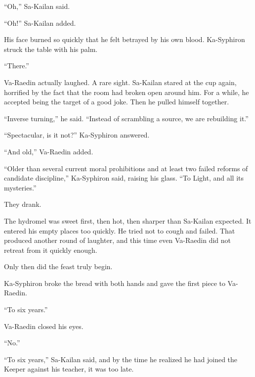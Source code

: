 “Oh,” Sa-Kailan said.\par
“Oh!” Sa-Kailan added.\par

His face burned so quickly that he felt betrayed by his own blood.
Ka-Syphiron struck the table with his palm.\par

“There.”\par

Va-Raedin actually laughed.
A rare sight.
Sa-Kailan stared at the cup again, horrified by the fact that the room had broken open around him.
For a while, he accepted being the target of a good joke.
Then he pulled himself together.\par

“Inverse turning,” he said.
“Instead of scrambling a source, we are rebuilding it.”\par
“Spectacular, is it not?” Ka-Syphiron answered.\par
“And old,” Va-Raedin added.\par

“Older than several current moral prohibitions and at least two failed reforms of candidate discipline,” Ka-Syphiron said, raising his glass.
“To Light, and all its mysteries.”\par

They drank.\par




The hydromel was sweet first, then hot, then sharper than Sa-Kailan expected.
It entered his empty places too quickly.
He tried not to cough and failed.
That produced another round of laughter, and this time even Va-Raedin did not retreat from it quickly enough.\par

Only then did the feast truly begin.\par

Ka-Syphiron broke the bread with both hands and gave the first piece to Va-Raedin.\par

“To six years.”\par

Va-Raedin closed his eyes.\par

“No.”\par

“To six years,” Sa-Kailan said, and by the time he realized he had joined the Keeper against his teacher, it was too late.\par

